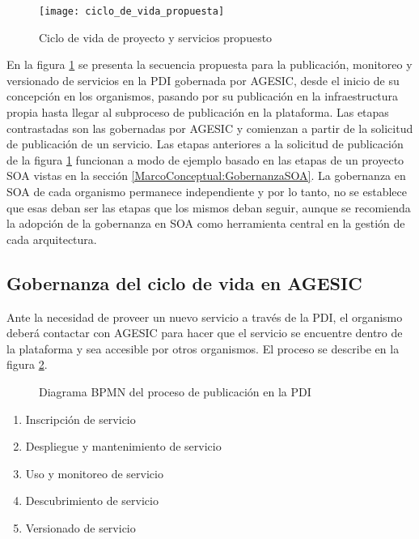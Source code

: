     \begin{figure}[h]
      \centering
      \texttt{[image: ciclo\_de\_vida\_propuesta]}
      \caption{Ciclo de vida de proyecto y servicios propuesto}
      \label{imagen:ciclo_de_vida_propuesta}
    \end{figure}

    En la figura \ref{imagen:ciclo_de_vida_propuesta} se presenta la secuencia propuesta para la publicación, monitoreo y versionado de servicios en la PDI gobernada por AGESIC, desde el inicio de su concepción en los organismos, pasando por su publicación en la infraestructura propia hasta llegar al subproceso de publicación en la plataforma. Las etapas contrastadas son las gobernadas por AGESIC y comienzan a partir de la solicitud de publicación de un servicio. Las etapas anteriores a la solicitud de publicación de la figura \ref{imagen:ciclo_de_vida_propuesta} funcionan a modo de ejemplo basado en las etapas de un proyecto SOA vistas en la sección \ref{MarcoConceptual:GobernanzaSOA}. La gobernanza en SOA de cada organismo permanece independiente y por lo tanto, no se establece que esas deban ser las etapas que los mismos deban seguir, aunque se recomienda la adopción de la gobernanza en SOA como herramienta central en la gestión de cada arquitectura.

  \subsection{Gobernanza del ciclo de vida en AGESIC}
    \label{Solucion:Gobernanza:CicloDeVidaAGESIC}

    Ante la necesidad de proveer un nuevo servicio a través de la PDI, el organismo deberá contactar con AGESIC para hacer que el servicio se encuentre dentro de la plataforma y sea accesible por otros organismos. El proceso se describe en la figura \ref{imagen:proceso_publicacion_pdi}.

    \begin{figure}[h]
      \centering
      \caption{Diagrama BPMN del proceso de publicación en la PDI}
      \label{imagen:proceso_publicacion_pdi}
    \end{figure}

    \begin{enumerate}
      \item Inscripción de servicio
      \item Despliegue y mantenimiento de servicio
      \item Uso y monitoreo de servicio
      \item Descubrimiento de servicio
      \item Versionado de servicio
    \end{enumerate}

